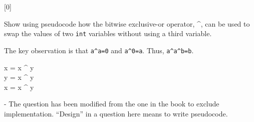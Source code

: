 \documentclass[addpoints]{exam}
\begin{document}
\begin{questions}
[0]

Show using pseudocode how the bitwise exclusive-or operator, \^{}, can be used to swap the values of two {\tt int} variables without using a third variable.
\begin{solution} The key observation is that {\tt a\^{}a=0} and {\tt a\^{}0=a}. Thus, {\tt a\^{}a\^{}b=b}.
  
  \begin{texttt}
    x = x \^{} y\\
    y = x \^{} y\\
    x = x \^{} y
  \end{texttt}
\end{solution}
\end{questions}

\noindent* - The question has been modified from the one in the book to exclude implementation. ``Design'' in a question here means to write pseudocode.
\end{document}
